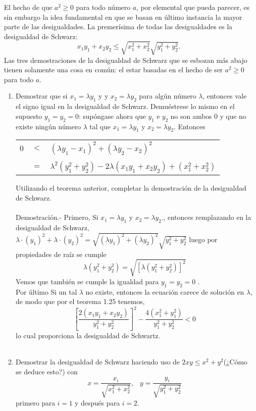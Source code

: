 \begin{teo}
El hecho de que $a^2 \geq 0$ para todo número $a$, por elemental que pueda parecer, es sin embargo la idea fundamental en que se basan en último instancia la mayor parte de las desigualdades. La premerísima de todas las desigualdades es la desigualdad de Schwarz: $$x_1y_1 + x_2y_2 \leq \sqrt{x_1^2 +x_2^2}\sqrt{y_1^2+y_2^2}.$$ Las tres demostraciones de la desigualdad de Schwarz que se esbozan más abajo tienen solamente una cosa en común: el estar basadas en el hecho de ser $a^2\geq 0$ para todo $a$.
\begin{enumerate}[\bfseries a)]
\item Demostrar que si $x_1=\lambda y_1$ \; y \; y $x_2=\lambda y_2$ para algún número $\lambda$, entonces vale el signo igual en la desigualdad de Schwarz. Demuéstrese lo mismo en el supuesto $y_1=y_2=0$: supóngase ahora que $y_1$ e $y_2$ no son ambos $0$ y que no existe ningún número $\lambda$ tal que $x_1=\lambda y_1$ \; y \; $x_2=\lambda y_2.$ Entonces
\begin{center}
\begin{tabular}{r c l}
$0$&$<$&$(\lambda y_1-x_1)^2+(\lambda y_2 -x_2)^2$\\\\
&$=$&$\lambda^2(y_1^2+y_2^2)-2\lambda(x_1 y_1 + x_2 y_2)+(x_1^2 +x_2^2)$\\
\end{tabular}
\end{center}
Utilizando el teorema anterior, completar la demostración de la desigualdad de Schwarz.\\\\
Demostración.- \; Primero, Si $x_1=\lambda y_1$ \; y \; $x_2=\lambda y_2.$, entonces remplazando en la desigualdad de Schwarz, $\lambda \cdot (y_1)^2 + \lambda \cdot (y_2)^2=\sqrt{(\lambda y_1)^2+(\lambda y_2)^2}\sqrt{y_1^2+y_2^2}$ luego por propiedades de raíz se cumple  $$\lambda(y_1^2+y_2^2) = \sqrt{\left[\lambda(y_1^2+y_2^2)\right]^2}$$
Vemos que también se cumple la igualdad para $y_1=y_2=0$ .\\
Por último Si un tal $\lambda$ no existe, entonces la ecuación carece de solución en $\lambda$, de modo que por el teorema 1.25 tenemos, $$\left[ \dfrac{2(x_1 y_1 + x_2 y_2)}{y_1^2 + y_2^2}  \right]^2 - \dfrac{4(x_1^2 +y_1^2)}{y_1^2 + y_2^2}<0$$ lo cual proporciona la desigualdad de Schwartz.\\\\
\item Demostrar la desigualdad de Schwarz haciendo uso de $2xy\leq x^2+y^2$(¿Cómo se deduce esto?) con $$x=\dfrac{x_i}{\sqrt{x_1^2 + x_2^2}}, \; \; \; y = \dfrac{y_i}{\sqrt{y_1^2+y_2^2}}$$ primero para $i=1$ y después para $i=2$.\\\\

\end{enumerate}
\end{teo}
